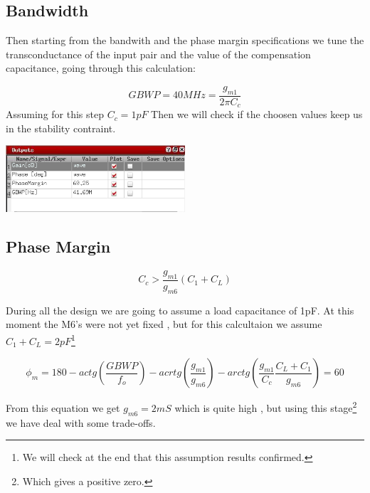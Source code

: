 
\subsection{Bandwidth} %
\label{subsec:bandwidth}



Then starting from the bandwith and the phase margin specifications we tune the transconductance of the input pair and the value of the compensation capacitance, going through this calculation:

\begin{equation}
	GBWP=40MHz=\frac{g_{m1}}{2 \pi C_c}
\end{equation}
Assuming for this step $C_c = 1pF$
Then we will check if the choosen values keep us in the stability contraint.



\centering
\includegraphics[width=0.5\textwidth]{Capitoli/gainprimo.png}
\raggedright


\subsection{Phase Margin} %
\label{subsec:phase_margin}

\begin{equation}
	C_c> \frac{g_{m1}}{g_{m6}}(C_1+C_L)
\end{equation}

During all the design we are going to assume a load capacitance of 1pF.
At this moment the M6's were not yet fixed , but for this calcultaion we assume $C_1+C_L=2pF$\footnote{We will check at the end that this assumption results confirmed.}

\begin{equation}
	\phi_m=180- actg(\frac {GBWP} {f_o} )-acrtg(\frac { g_{m1} }{ g_{m6}})-arctg(\frac{g_{m1}} {C_c}\frac{C_L+C_1}{g_{m6}})=60 
\end{equation}

From this equation we get $g_{m6} = 2mS $ which is quite high , but using this stage\footnote{Which gives a positive zero.} we have deal with some trade-offs.

